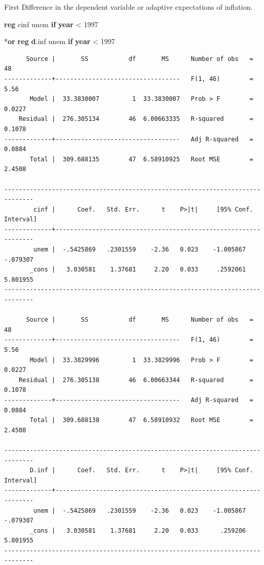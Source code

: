 \documentclass[
]{book}
\newenvironment{Shaded}{\begin{snugshade}}{\end{snugshade}}
\newcommand{\FunctionTok}[1]{\textcolor[rgb]{0.13,0.29,0.53}{\textbf{#1}}}
\newcommand{\KeywordTok}[1]{\textcolor[rgb]{0.13,0.29,0.53}{\textbf{#1}}}
\newcommand{\NormalTok}[1]{#1}
\begin{document}
First Difference in the dependent variable or adaptive expectations of inflation.

\begin{Shaded}
\begin{Highlighting}[]
\KeywordTok{reg}\NormalTok{ cinf unem }\KeywordTok{if} \FunctionTok{year}\NormalTok{ \textless{} 1997}

\NormalTok{*}\KeywordTok{or}
\KeywordTok{reg} \KeywordTok{d}\NormalTok{.inf unem }\KeywordTok{if} \FunctionTok{year}\NormalTok{ \textless{} 1997}
\end{Highlighting}
\end{Shaded}

\begin{verbatim}
      Source |       SS           df       MS      Number of obs   =        48
-------------+----------------------------------   F(1, 46)        =      5.56
       Model |  33.3830007         1  33.3830007   Prob > F        =    0.0227
    Residual |  276.305134        46  6.00663335   R-squared       =    0.1078
-------------+----------------------------------   Adj R-squared   =    0.0884
       Total |  309.688135        47  6.58910925   Root MSE        =    2.4508

------------------------------------------------------------------------------
        cinf |      Coef.   Std. Err.      t    P>|t|     [95% Conf. Interval]
-------------+----------------------------------------------------------------
        unem |  -.5425869   .2301559    -2.36   0.023    -1.005867    -.079307
       _cons |   3.030581    1.37681     2.20   0.033     .2592061    5.801955
------------------------------------------------------------------------------

      Source |       SS           df       MS      Number of obs   =        48
-------------+----------------------------------   F(1, 46)        =      5.56
       Model |  33.3829996         1  33.3829996   Prob > F        =    0.0227
    Residual |  276.305138        46  6.00663344   R-squared       =    0.1078
-------------+----------------------------------   Adj R-squared   =    0.0884
       Total |  309.688138        47  6.58910932   Root MSE        =    2.4508

------------------------------------------------------------------------------
       D.inf |      Coef.   Std. Err.      t    P>|t|     [95% Conf. Interval]
-------------+----------------------------------------------------------------
        unem |  -.5425869   .2301559    -2.36   0.023    -1.005867    -.079307
       _cons |   3.030581    1.37681     2.20   0.033      .259206    5.801955
------------------------------------------------------------------------------
\end{verbatim}
\end{document}
